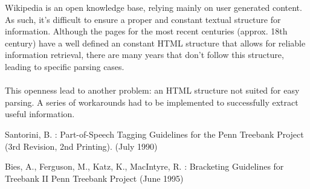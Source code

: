 \documentclass{llncs}
\begin{document}
Wikipedia is an open knowledge base, relying mainly on user generated content. As such, it's difficult to ensure a proper and constant textual structure for information. Although the pages for the most recent centuries (approx. 18th century) have a well defined an constant HTML structure that allows for reliable information retrieval, there are many years that don't follow this structure, leading to specific parsing cases.\\
\ \\
This openness lead to another problem: an HTML structure not suited for easy parsing. A series of workarounds had to be implemented to successfully extract useful information.

\newpage
%
%
\begin{thebibliography}{}
%
Santorini, B. :
Part-of-Speech Tagging Guidelines for the
Penn Treebank Project (3rd Revision, 2nd Printing).
(July 1990)

Bies, A., Ferguson, M., Katz, K., MacIntyre, R. :
Bracketing Guidelines for Treebank II
Penn Treebank Project
(June 1995)

\end{thebibliography}
\clearpage
{} %
\renewcommand{\indexname}{Author Index}
\printindex
\clearpage
{} %
\renewcommand{\indexname}{Subject Index}

\end{document}
